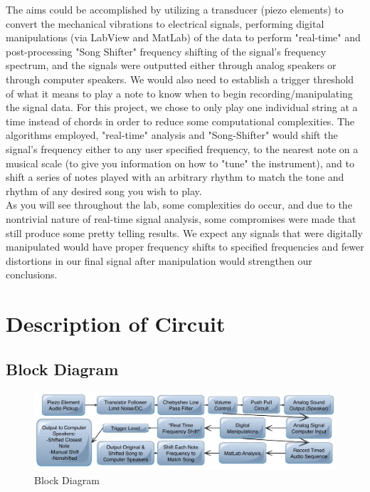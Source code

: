 \documentclass{article}
\begin{document}
    \indent The aims could be accomplished by utilizing a transducer (piezo elements) to convert the mechanical vibrations to electrical signals, performing digital manipulations (via LabView and MatLab) of the data to perform "real-time" and post-processing "Song Shifter" frequency shifting of the signal's frequency spectrum, and the signals were outputted either through analog speakers or through computer speakers. We would also need to establish a trigger threshold of what it means to play a note to know when to begin recording/manipulating the signal data. For this project, we chose to only play one individual string at a time instead of chords in order to reduce some computational complexities. The algorithms employed, "real-time" analysis and "Song-Shifter" would shift the signal's frequency either to any user specified frequency, to the nearest note on a musical scale (to give you information on how to "tune" the instrument), and to shift a series of notes played with an arbitrary rhythm to match the tone and rhythm of any desired song you wish to play. \\\indent As you will see throughout the lab, some complexities do occur, and due to the nontrivial nature of real-time signal analysis, some compromises were made that still produce some pretty telling results. We expect any signals that were digitally manipulated would have proper frequency shifts to specified frequencies and fewer distortions in our final signal after manipulation would strengthen our conclusions.
    
    
\section{Description of Circuit}
    \subsection{Block Diagram}
        \begin{figure}[H]
            \centering
            \includegraphics[scale = 0.13]{finalBlockDiagram.jpg}
            \caption{Block Diagram}
            \label{fig:my_label}
        \end{figure}
\end{document}
